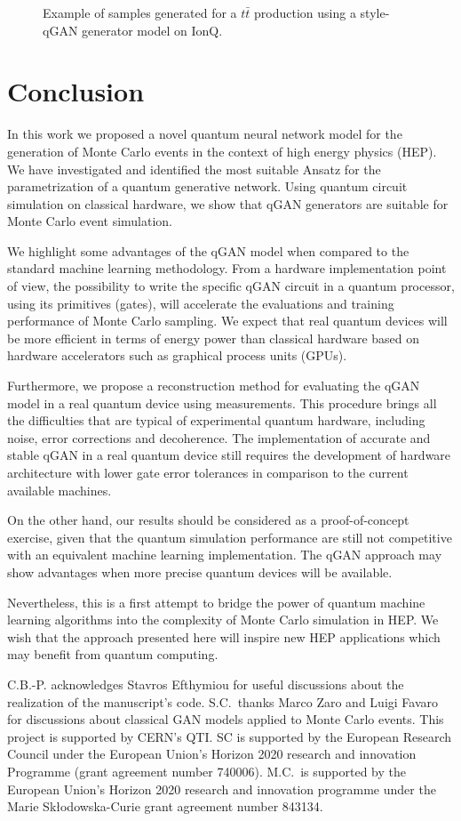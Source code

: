 \documentclass[twocolumn,preprintnumbers,superscriptaddress]{revtex4-2}
\begin{document}
\begin{figure}
  \caption{\label{fig:ionq}Example of samples generated for a $t\bar{t}$
    production using a style-qGAN generator model on IonQ.}
\end{figure}


\section{Conclusion}
\label{sec:conclusion}

In this work we proposed a novel quantum neural network model for the generation
of Monte Carlo events in the context of high energy physics (HEP). We have
investigated and identified the most suitable Ansatz for the parametrization of
a quantum generative network. Using quantum circuit simulation on classical
hardware, we show that qGAN generators are suitable for Monte Carlo event
simulation.

We highlight some advantages of the qGAN model when compared to the standard
machine learning methodology. From a hardware implementation point of view, the
possibility to write the specific qGAN circuit in a quantum processor, using its
primitives (gates), will accelerate the evaluations and training performance of
Monte Carlo sampling. We expect that real quantum devices will be more efficient
in terms of energy power than classical hardware based on hardware accelerators
such as graphical process units (GPUs).

Furthermore, we propose a reconstruction method for evaluating the qGAN model in
a real quantum device using measurements. This procedure brings all the
difficulties that are typical of experimental quantum hardware, including noise,
error corrections and decoherence. The implementation of accurate and stable
qGAN in a real quantum device still requires the development of hardware
architecture with lower gate error tolerances in comparison to the current
available machines.

On the other hand, our results should be considered as a proof-of-concept
exercise, given that the quantum simulation performance are still not
competitive with an equivalent machine learning implementation. The qGAN
approach may show advantages when more precise quantum devices will be
available.

Nevertheless, this is a first attempt to bridge the power of quantum machine
learning algorithms into the complexity of Monte Carlo simulation in HEP. We
wish that the approach presented here will inspire new HEP applications which
may benefit from quantum computing.

\acknowledgments

C.B.-P. acknowledges Stavros Efthymiou for useful discussions about the
realization of the manuscript's code. S.C.~thanks Marco Zaro and Luigi Favaro for
discussions about classical GAN models applied to Monte Carlo events. This
project is supported by CERN's QTI. SC is supported by the European Research
Council under the European Union's Horizon 2020 research and innovation
Programme (grant agreement number 740006).
M.C.\ is supported by the European Union’s Horizon 2020 research and innovation programme under the Marie Skłodowska-Curie grant agreement number 843134.


\end{document}

